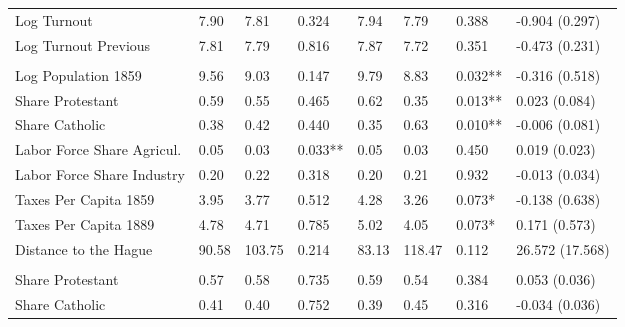 \begin{table}[!h]
{\begin{threeparttable}
\begin{tabular}[t]{llllllll}
\hspace{1em}Log Turnout & \num{7.90} & \num{7.81} & 0.324 & \num{7.94} & \num{7.79} & 0.388 & -0.904 (0.297)\\
\hspace{1em}Log Turnout Previous & \num{7.81} & \num{7.79} & 0.816 & \num{7.87} & \num{7.72} & 0.351 & -0.473 (0.231)\\
\addlinespace[0.3em]
\multicolumn{8}{l}{\textbf{Panel D: Birthplace Characteristics}}\\
\hspace{1em}Log Population 1859 & \num{9.56} & \num{9.03} & 0.147 & \num{9.79} & \num{8.83} & 0.032** & -0.316 (0.518)\\
\hspace{1em}Share Protestant & \num{0.59} & \num{0.55} & 0.465 & \num{0.62} & \num{0.35} & 0.013** & 0.023 (0.084)\\
\hspace{1em}Share Catholic & \num{0.38} & \num{0.42} & 0.440 & \num{0.35} & \num{0.63} & 0.010** & -0.006 (0.081)\\
\hspace{1em}Labor Force Share Agricul. & \num{0.05} & \num{0.03} & 0.033** & \num{0.05} & \num{0.03} & 0.450 & 0.019 (0.023)\\
\hspace{1em}Labor Force Share Industry & \num{0.20} & \num{0.22} & 0.318 & \num{0.20} & \num{0.21} & 0.932 & -0.013 (0.034)\\
\hspace{1em}Taxes Per Capita 1859 & \num{3.95} & \num{3.77} & 0.512 & \num{4.28} & \num{3.26} & 0.073* & -0.138 (0.638)\\
\hspace{1em}Taxes Per Capita 1889 & \num{4.78} & \num{4.71} & 0.785 & \num{5.02} & \num{4.05} & 0.073* & 0.171 (0.573)\\
\hspace{1em}Distance to the Hague & \num{90.58} & \num{103.75} & 0.214 & \num{83.13} & \num{118.47} & 0.112 & 26.572 (17.568)\\
\addlinespace[0.3em]
\multicolumn{8}{l}{\textbf{Panel E: District Characteristics}}\\
\hspace{1em}Share Protestant & \num{0.57} & \num{0.58} & 0.735 & \num{0.59} & \num{0.54} & 0.384 & 0.053 (0.036)\\
\hspace{1em}Share Catholic & \num{0.41} & \num{0.40} & 0.752 & \num{0.39} & \num{0.45} & 0.316 & -0.034 (0.036)\\

\end{tabular}
\end{threeparttable}}
\end{table}
